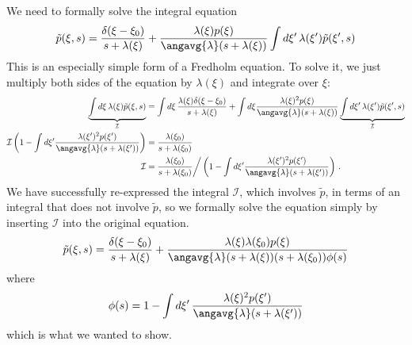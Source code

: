


We need to formally solve the integral equation
\begin{equation}
  \tilde{p}(\xi, s)
  = \frac{\delta(\xi - \xi_0)}{s + \lambda(\xi)}
  + \frac{\lambda(\xi) p(\xi)}{\angavg{\lambda} (s + \lambda(\xi))}
  \int d\xi' \, \lambda(\xi') \tilde{p}(\xi', s)
\end{equation}
This is an especially simple form of a Fredholm equation.
To solve it, we just multiply both sides of the equation by $\lambda(\xi)$ and integrate over $\xi$:
\begin{align}
  \underbrace{\int d\xi \, \lambda(\xi) \tilde{p}(\xi, s)}_\mathcal{I}
  &= \int d\xi \, \frac{\lambda(\xi) \delta(\xi - \xi_0)}{s + \lambda(\xi)}
  + \int d\xi \frac{\lambda(\xi)^2 p(\xi)}{\angavg{\lambda}(s + \lambda(\xi))}
  \underbrace{\int d\xi' \, \lambda(\xi') \tilde{p}(\xi', s)}_\mathcal{I} \nonumber \\
  \mathcal{I}
  \left(
    1 - \int d\xi' \frac{\lambda(\xi')^2p(\xi')}{\angavg{\lambda}(s + \lambda(\xi'))}
  \right)
  &= \frac{\lambda(\xi_0)}{s + \lambda(\xi_0)} \nonumber \\
  \mathcal{I}
  &= \frac{\lambda(\xi_0)}{s + \lambda(\xi_0)}
  \bigg/
  \left(
    1 - \int d\xi' \frac{\lambda(\xi')^2p(\xi')}{\angavg{\lambda}(s + \lambda(\xi'))}
  \right) \nonumber
  \, .
\end{align}
We have successfully re-expressed the integral $\mathcal{I}$, which involves $\tilde{p}$, in terms of an integral that does not involve $\tilde{p}$, so we formally solve the equation simply by inserting $\mathcal{I}$ into the original equation.
\begin{equation}
  \tilde{p}(\xi, s)
  = \frac{\delta(\xi - \xi_0)}{s + \lambda(\xi)}
  + \frac{\lambda(\xi) \lambda(\xi_0) p(\xi)}{\angavg{\lambda}(s + \lambda(\xi))(s + \lambda(\xi_0))\phi(s)}
\end{equation}
where
\begin{equation}
  \phi(s)
  = 1 - \int d\xi' \, \frac{\lambda(\xi)^2 p(\xi')}{\angavg{\lambda} (s + \lambda(\xi'))}
\end{equation}
which is what we wanted to show.

